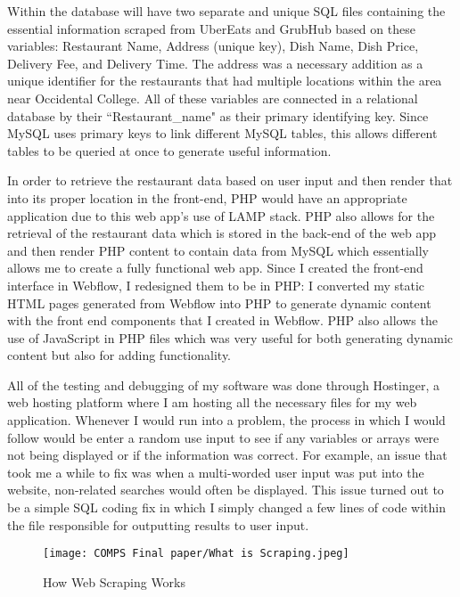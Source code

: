 \documentclass[10pt,twocolumn]{article}
\begin{document}
Within the database will have two separate and unique SQL files containing the essential information scraped from UberEats and GrubHub based on these variables: Restaurant Name, Address (unique key), Dish Name, Dish Price, Delivery Fee, and Delivery Time. The address was a necessary addition as a unique identifier for the restaurants that had multiple locations within the area near Occidental College. All of these variables are connected in a relational database by their “Restaurant\_name" as their primary identifying key. Since MySQL uses primary keys to link different MySQL tables, this allows different tables to be queried at once to generate useful information. 

In order to retrieve the restaurant data based on user input and then render that into its proper location in the front-end, PHP would have an appropriate application due to this web app's use of LAMP stack. PHP also allows for the retrieval of the restaurant data which is stored in the back-end of the web app and then render PHP content to contain data from MySQL which essentially allows me to create a fully functional web app. Since I created the front-end interface in Webflow, I redesigned them to be in PHP: I converted my static HTML pages generated from Webflow into PHP to generate dynamic content with the front end components that I created in Webflow. PHP also allows the use of JavaScript in PHP files which was very useful for both generating dynamic content but also for adding functionality.

All of the testing and debugging of my software was done through Hostinger, a web hosting platform where I am hosting all the necessary files for my web application. Whenever I would run into a problem, the process in which I would follow would be enter a random use input to see if any variables or arrays were not being displayed or if the information was correct. For example, an issue that took me a while to fix was when a multi-worded user input was put into the website, non-related searches would often be displayed. This issue turned out to be a simple SQL coding fix in which I simply changed a few lines of code within the file responsible for outputting results to user input.

\begin{figure}
    \centering
    \texttt{[image: COMPS Final paper/What is Scraping.jpeg]}
    \caption{
        How Web Scraping Works
    }
    \label{fig:second-page-4}
\end{figure}
\end{document}
